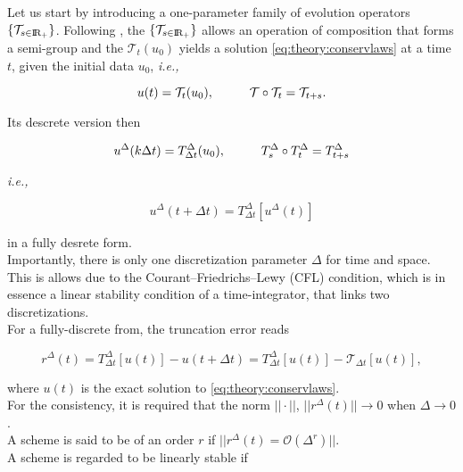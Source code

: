 \documentclass[11pt,a4paper,headinclude=true,DIV=14,BCOR=8mm,chapterprefix,listof=totoc,twoside,openright,abstracton]{scrbook}
\begin{document}
Let us start by introducing a one-parameter family of evolution operators $\{\mathcal{T}_{s\in\text{I\!R}_+}\}$. Following \cite{Kruzkov:1970}, the $\{\mathcal{T}_{s\in\text{I\!R}_+}\}$ allows an operation of composition that forms a semi-group and the $\mathcal{T}_t(u_0)$ yields a solution \ref{eq:theory:conservlaws} at a time $t$, given the initial data $u_0$, \textit{i.e.,}

\begin{equation}
    u(t) = \mathcal{T}_t(u_0), \hspace{10mm} \mathcal{T}\circ\mathcal{T}_t = \mathcal{T}_{t+s}.
\end{equation}

Its descrete version then

\begin{equation}
    u^{\Delta}(k\Delta t) = T^{\Delta}_{\Delta t}(u_0), \hspace{10mm} T^{\Delta}_s\circ T^{\Delta}_t = T^{\Delta} _{t+s}
\end{equation}

\textit{i.e.,}

\begin{equation}
    u^{\Delta}(t+\Delta t) = T^{\Delta} _{\Delta t}[u^{\Delta}(t)]
\end{equation}

in a fully desrete form. \\

Importantly, there is only one discretization parameter $\Delta$ for time and space. This is allows due to the  Courant–Friedrichs–Lewy (CFL) condition, which is in essence a linear stability condition of a time-integrator, that links two discretizations. \\

For a fully-discrete from, the truncation error reads 

\begin{equation}
    r^{\Delta}(t) = T^{\Delta}_{\Delta t}[u(t)] - u(t + \Delta t) = T^{\Delta}_{\Delta t}[u(t)] - \mathcal{T}_{\Delta t}[u(t)],
\end{equation}

where $u(t)$ is the exact solution to \ref{eq:theory:conservlaws}. \\
For the consistency, it is required that the norm $||\cdot||$, $||r^{\Delta}(t)||\rightarrow 0$ when $\Delta\rightarrow 0$. \\
A scheme is said to be of an order $r$ if $||r^{\Delta}(t) = \mathcal{O}(\Delta^r)||$. \\
A scheme is regarded to be linearly stable if 
\end{document}
